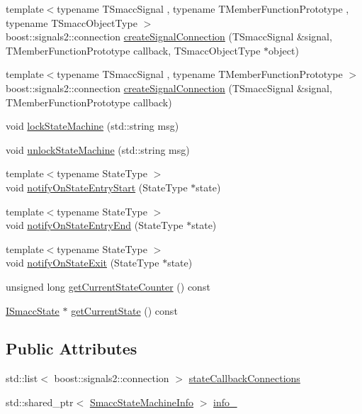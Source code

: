 \begin{DoxyCompactItemize}
\item 
{\footnotesize template$<$typename T\+Smacc\+Signal , typename T\+Member\+Function\+Prototype , typename T\+Smacc\+Object\+Type $>$ }\\boost\+::signals2\+::connection \hyperlink{classsmacc_1_1ISmaccStateMachine_adf0f42ade0c65cc471960fe2a7c42da2}{create\+Signal\+Connection} (T\+Smacc\+Signal \&signal, T\+Member\+Function\+Prototype callback, T\+Smacc\+Object\+Type $\ast$object)
\item 
{\footnotesize template$<$typename T\+Smacc\+Signal , typename T\+Member\+Function\+Prototype $>$ }\\boost\+::signals2\+::connection \hyperlink{classsmacc_1_1ISmaccStateMachine_a9248dd505790b9d46d6dbebeb31bf5f8}{create\+Signal\+Connection} (T\+Smacc\+Signal \&signal, T\+Member\+Function\+Prototype callback)
\item 
void \hyperlink{classsmacc_1_1ISmaccStateMachine_a5c8d4c9a4b11c7950266a00e48080ce3}{lock\+State\+Machine} (std\+::string msg)
\item 
void \hyperlink{classsmacc_1_1ISmaccStateMachine_ae2e3ceb87bfe3f9d8bf320e36071fdc7}{unlock\+State\+Machine} (std\+::string msg)
\item 
{\footnotesize template$<$typename State\+Type $>$ }\\void \hyperlink{classsmacc_1_1ISmaccStateMachine_aeec54e997d715b105ebfeb5caadc4fbf}{notify\+On\+State\+Entry\+Start} (State\+Type $\ast$state)
\item 
{\footnotesize template$<$typename State\+Type $>$ }\\void \hyperlink{classsmacc_1_1ISmaccStateMachine_a856cf2d25d84659b974cccfbf44aeec9}{notify\+On\+State\+Entry\+End} (State\+Type $\ast$state)
\item 
{\footnotesize template$<$typename State\+Type $>$ }\\void \hyperlink{classsmacc_1_1ISmaccStateMachine_a9d2bd4aca0c80a1ec22c5f95e7c38db8}{notify\+On\+State\+Exit} (State\+Type $\ast$state)
\item 
unsigned long \hyperlink{classsmacc_1_1ISmaccStateMachine_a03966e531cefc1e096bffa46111871d2}{get\+Current\+State\+Counter} () const 
\item 
\hyperlink{classsmacc_1_1ISmaccState}{I\+Smacc\+State} $\ast$ \hyperlink{classsmacc_1_1ISmaccStateMachine_a8c39c1eedb7236e67739dab6e2229511}{get\+Current\+State} () const 
\end{DoxyCompactItemize}
\subsection*{Public Attributes}
\begin{DoxyCompactItemize}
\item 
std\+::list$<$ boost\+::signals2\+::connection $>$ \hyperlink{classsmacc_1_1ISmaccStateMachine_aaf98bb0edaa5d8c84767e4acfad3548d}{state\+Callback\+Connections}
\item 
std\+::shared\+\_\+ptr$<$ \hyperlink{classsmacc_1_1introspection_1_1SmaccStateMachineInfo}{Smacc\+State\+Machine\+Info} $>$ \hyperlink{classsmacc_1_1ISmaccStateMachine_a5ec3201cbddab4f062f572fb33021041}{info\+\_\+}
\end{DoxyCompactItemize}
